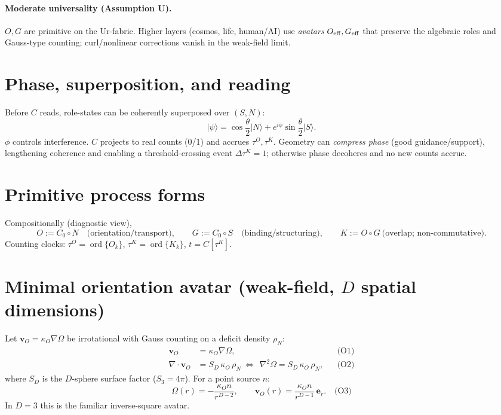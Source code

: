 \documentclass[12pt,a4paper,oneside]{scrreprt}
\begin{document}
\paragraph{Moderate universality (Assumption U).}
$O,G$ are primitive on the Ur-fabric. Higher layers (cosmos, life, human/AI) use \emph{avatars} $O_{\rm eff},G_{\rm eff}$ that preserve the algebraic roles and Gauss-type counting; curl/nonlinear corrections vanish in the weak-field limit.

\section{Phase, superposition, and reading}\label{sec:ur-phase}
Before $C$ reads, role-states can be coherently superposed over $(S,N)$:
\[
\lvert\psi\rangle=\cos\frac{\theta}{2}\lvert N\rangle+e^{i\phi}\sin\frac{\theta}{2}\lvert S\rangle.
\]
$\phi$ controls interference. $C$ projects to real counts (0/1) and accrues $\tau^O,\tau^K$. Geometry can \emph{compress phase} (good guidance/support), lengthening coherence and enabling a threshold-crossing event $\Delta\tau^K=1$; otherwise phase decoheres and no new counts accrue.

\section{Primitive process forms}\label{sec:ur-primitives}
Compositionally (diagnostic view),
\begin{equation}
O:=C_0\!\circ N\quad\text{(orientation/transport)},\qquad
G:=C_0\!\circ S\quad\text{(binding/structuring)},\qquad
K:=O\!\circ G\ \text{(overlap; non-commutative)}.
\end{equation}
Counting clocks: $\tau^O=\operatorname{ord}\{O_k\}$, $\tau^K=\operatorname{ord}\{K_k\}$, $t=C[\tau^K]$.

\section{Minimal orientation avatar (weak-field, \(D\) spatial dimensions)}\label{sec:ur-orientation}
Let $\mathbf v_O=\kappa_O\nabla\Omega$ be irrotational with Gauss counting on a deficit density $\rho_N$:
\begin{align}
\mathbf v_O&=\kappa_O\nabla\Omega, &&\text{(O1)}\\
\nabla\!\cdot\mathbf v_O&=S_D\,\kappa_O\,\rho_N 
\ \Longleftrightarrow\ \ \nabla^2\Omega=S_D\,\kappa_O\,\rho_N, &&\text{(O2)}
\end{align}
where $S_D$ is the $D$-sphere surface factor ($S_3=4\pi$). For a point source $n$:
\begin{equation}
\Omega(r)=-\frac{\kappa_On}{r^{D-2}},\qquad 
\mathbf v_O(r)=\frac{\kappa_On}{r^{D-1}}\,\mathbf e_r.\quad\text{(O3)}
\end{equation}
In $D\!=\!3$ this is the familiar inverse-square avatar.
\end{document}
